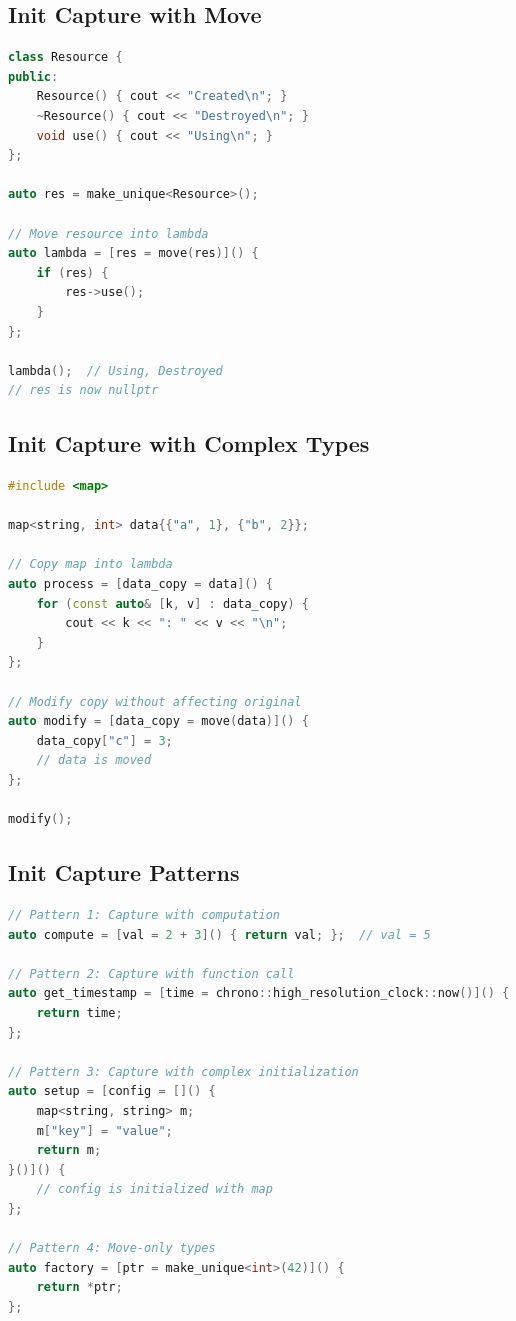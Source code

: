 \hypertarget{init-capture-with-move}{%
\subsection{Init Capture with Move}\label{init-capture-with-move}}

\begin{lstlisting}[language={C++}]
class Resource {
public:
    Resource() { cout << "Created\n"; }
    ~Resource() { cout << "Destroyed\n"; }
    void use() { cout << "Using\n"; }
};

auto res = make_unique<Resource>();

// Move resource into lambda
auto lambda = [res = move(res)]() {
    if (res) {
        res->use();
    }
};

lambda();  // Using, Destroyed
// res is now nullptr
\end{lstlisting}

\hypertarget{init-capture-with-complex-types}{%
\subsection{Init Capture with Complex
Types}\label{init-capture-with-complex-types}}

\begin{lstlisting}[language={C++}]
#include <map>

map<string, int> data{{"a", 1}, {"b", 2}};

// Copy map into lambda
auto process = [data_copy = data]() {
    for (const auto& [k, v] : data_copy) {
        cout << k << ": " << v << "\n";
    }
};

// Modify copy without affecting original
auto modify = [data_copy = move(data)]() {
    data_copy["c"] = 3;
    // data is moved
};

modify();
\end{lstlisting}

\hypertarget{init-capture-patterns}{%
\subsection{Init Capture Patterns}\label{init-capture-patterns}}

\begin{lstlisting}[language={C++}]
// Pattern 1: Capture with computation
auto compute = [val = 2 + 3]() { return val; };  // val = 5

// Pattern 2: Capture with function call
auto get_timestamp = [time = chrono::high_resolution_clock::now()]() {
    return time;
};

// Pattern 3: Capture with complex initialization
auto setup = [config = []() {
    map<string, string> m;
    m["key"] = "value";
    return m;
}()]() {
    // config is initialized with map
};

// Pattern 4: Move-only types
auto factory = [ptr = make_unique<int>(42)]() {
    return *ptr;
};
\end{lstlisting}

